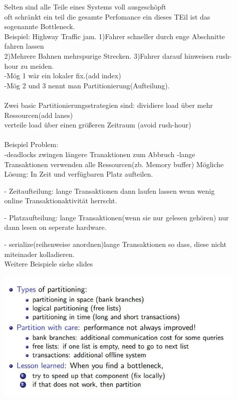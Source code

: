 \documentclass[12pt]{article}\pagestyle{myheadings}
\theoremstyle{plain}
\begin{document}
\begin{enumerate}
\begin{itemize}
Selten sind alle Teile eines Systems voll ausgeschöpft\\
oft schränkt ein teil die gesamte Perfomance ein dieses TEil ist das sogenannte Bottleneck.\\
Beispiel: Highway Traffic jam.
1)Fahrer schneller durch enge Abschnitte fahren lassen\\
2)Mehrere Bahnen mehrspurige Strecken.
3)Fahrer darauf hinweisen rush-hour zu meiden.
\\
-Mög 1 wär ein  lokaler fix.(add index)\\
-Mög 2 und 3 nennt man Partitionierung(Aufteilung).\\ \\
Zwei basic Partitionierungsstrategien sind:
\quad dividiere load über mehr Ressourcen(add lanes)\\
\quad verteile load über einen größeren Zeitraum (avoid rush-hour)\\ \\
Beispiel Problem: \\
-deadlocks zwingen längere Tranaktionen zum Abbruch
-lange Transaktionen verwenden alle Ressourcen(zb. Memory buffer)
Mögliche Lösung: In Zeit und verfügbaren Platz aufteilen.
\item[-]Zeitaufteilung: lange Transaktionen dann laufen lassen wenn wenig online Transaktionaktivität herrscht.\\
\item[-]Platzaufteilung: lange Transaktionen(wenn sie nur gelesen gehören) nur dann lesen on seperate hardware.\\
\item[-] serialize(reihenweise anordnen)lange Transaktionen so dass, diese nicht miteinader kolladieren.\\
Weitere Beispiele siehe slides \\
\begin{center}
\includegraphics[scale=0.8]{bottleneck.jpg}  

\end{center}
\end{itemize}
\end{enumerate}
\end{document}

